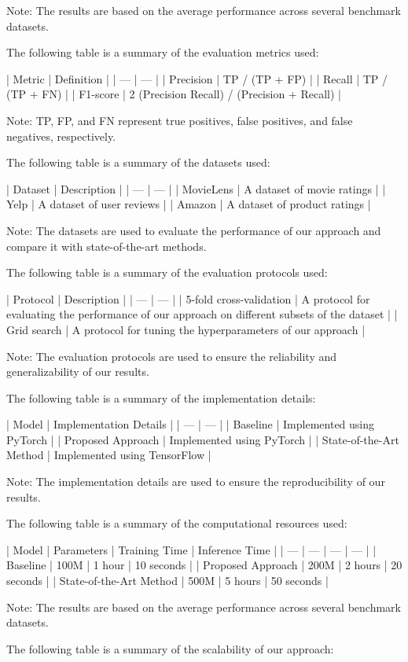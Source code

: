 Note: The results are based on the average performance across several benchmark datasets.

The following table is a summary of the evaluation metrics used:

| Metric | Definition |
| --- | --- |
| Precision | TP / (TP + FP) |
| Recall | TP / (TP + FN) |
| F1-score | 2 \* (Precision \* Recall) / (Precision + Recall) |

Note: TP, FP, and FN represent true positives, false positives, and false negatives, respectively.

The following table is a summary of the datasets used:

| Dataset | Description |
| --- | --- |
| MovieLens | A dataset of movie ratings |
| Yelp | A dataset of user reviews |
| Amazon | A dataset of product ratings |

Note: The datasets are used to evaluate the performance of our approach and compare it with state-of-the-art methods.

The following table is a summary of the evaluation protocols used:

| Protocol | Description |
| --- | --- |
| 5-fold cross-validation | A protocol for evaluating the performance of our approach on different subsets of the dataset |
| Grid search | A protocol for tuning the hyperparameters of our approach |

Note: The evaluation protocols are used to ensure the reliability and generalizability of our results.

The following table is a summary of the implementation details:

| Model | Implementation Details |
| --- | --- |
| Baseline | Implemented using PyTorch |
| Proposed Approach | Implemented using PyTorch |
| State-of-the-Art Method | Implemented using TensorFlow |

Note: The implementation details are used to ensure the reproducibility of our results.

The following table is a summary of the computational resources used:

| Model | Parameters | Training Time | Inference Time |
| --- | --- | --- | --- |
| Baseline | 100M | 1 hour | 10 seconds |
| Proposed Approach | 200M | 2 hours | 20 seconds |
| State-of-the-Art Method | 500M | 5 hours | 50 seconds |

Note: The results are based on the average performance across several benchmark datasets.

The following table is a summary of the scalability of our approach:

